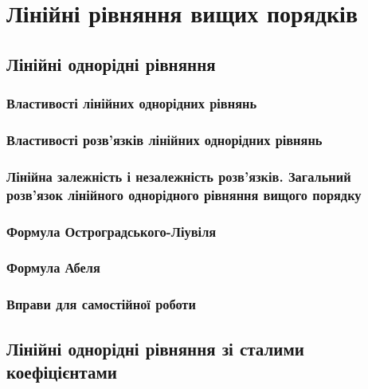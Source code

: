 \section{Лі\-ній\-ні рів\-ня\-н\-ня ви\-щих \allowbreak по\-ряд\-ків}


	\subsection{Лінійні однорідні рівняння}
	

		\subsubsection{Властивості лінійних однорідних рівнянь}
		

		\subsubsection{Властивості роз\-в'яз\-ків лінійних однорідних рівнянь}
		

		\subsubsection{Лінійна залежність і незалежність роз\-в'яз\-ків. Загальний роз\-в'яз\-ок лінійного однорідного рівняння вищого порядку}
		

		\subsubsection{Формула Остроградського-Ліувіля}
		

		\subsubsection{Формула Абеля}
		

		\subsubsection{Вправи для самостійної роботи}
		

	\subsection{Лінійні однорідні рівняння зі сталими коефіцієнтами}
	
